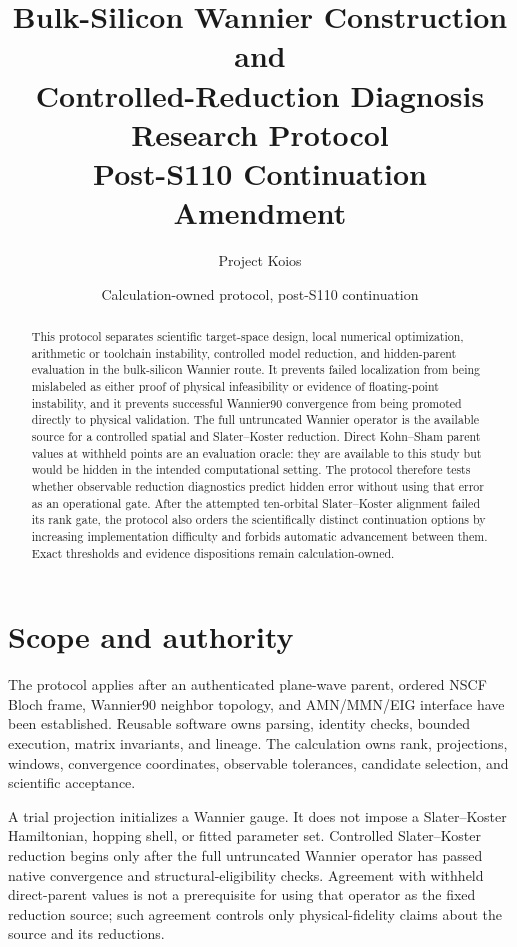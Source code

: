 \documentclass[11pt]{article}
\title{Bulk-Silicon Wannier Construction and\\Controlled-Reduction Diagnosis Research Protocol\\Post-S110 Continuation Amendment}
\author{Project Koios}
\date{Calculation-owned protocol, post-S110 continuation}
\begin{document}
\maketitle

\begin{abstract}
This protocol separates scientific target-space design, local numerical optimization,
arithmetic or toolchain instability, controlled model reduction, and hidden-parent
evaluation in the bulk-silicon Wannier route.  It prevents failed localization from
being mislabeled as either proof of physical infeasibility or evidence of floating-point
instability, and it prevents successful Wannier90 convergence from being promoted
directly to physical validation.  The full untruncated Wannier operator is the available
source for a controlled spatial and Slater--Koster reduction.  Direct Kohn--Sham parent
values at withheld points are an evaluation oracle: they are available to this study but
would be hidden in the intended computational setting.  The protocol therefore tests
whether observable reduction diagnostics predict hidden error without using that error
as an operational gate.  After the attempted ten-orbital Slater--Koster alignment
failed its rank gate, the protocol also orders the scientifically distinct continuation
options by increasing implementation difficulty and forbids automatic advancement
between them.  Exact thresholds and evidence dispositions remain calculation-owned.
\end{abstract}

\section{Scope and authority}

The protocol applies after an authenticated plane-wave parent, ordered NSCF Bloch frame,
Wannier90 neighbor topology, and AMN/MMN/EIG interface have been established.  Reusable
software owns parsing, identity checks, bounded execution, matrix invariants, and lineage.
The calculation owns rank, projections, windows, convergence coordinates, observable
tolerances, candidate selection, and scientific acceptance.

A trial projection initializes a Wannier gauge.  It does not impose a Slater--Koster
Hamiltonian, hopping shell, or fitted parameter set.  Controlled Slater--Koster
reduction begins only after the full untruncated Wannier operator has passed native
convergence and structural-eligibility checks.  Agreement with withheld direct-parent
values is not a prerequisite for using that operator as the fixed reduction source;
such agreement controls only physical-fidelity claims about the source and its
reductions.
\end{document}
